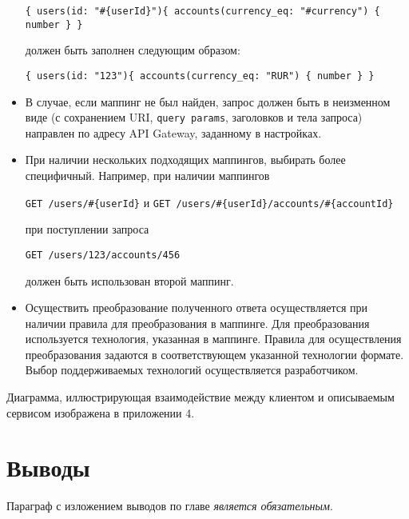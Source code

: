 \begin{itemize}
    \texttt{\{ users(id: "\#\{userId\}")\{ accounts(currency\_eq: "\#{currency}") \{ number \} \}}

    должен быть заполнен следующим образом:

    \texttt{\{ users(id: "123")\{ accounts(currency\_eq: "RUR") \{ number \} \}}

    \item В случае, если маппинг не был найден, запрос должен быть в неизменном виде (с сохранением URI, \texttt{query params}, заголовков и тела запроса) направлен по адресу API Gateway, заданному в настройках.

    \item При наличии нескольких подходящих маппингов, выбирать более специфичный.
    Например, при наличии маппингов

    \texttt{GET /users/\#\{userId\}} и \texttt{GET /users/\#\{userId\}/accounts/\#\{accountId\}}

    при поступлении запроса

    \texttt{GET /users/123/accounts/456}

    должен быть использован второй маппинг.

    \item Осуществить преобразование полученного ответа осуществляется при наличии правила для преобразования в маппинге.
    Для преобразования используется технология, указанная в маппинге.
    Правила для осуществления преобразования задаются в соответствующем указанной технологии формате.
    Выбор поддерживаемых технологий осуществляется разработчиком.
\end{itemize}

Диаграмма, иллюстрирующая взаимодействие между клиентом и описываемым сервисом изображена в приложении 4.


\section{Выводы} \label{sec:ch2-conclusion}

Параграф с изложением выводов по главе \textit{является обязательным}.